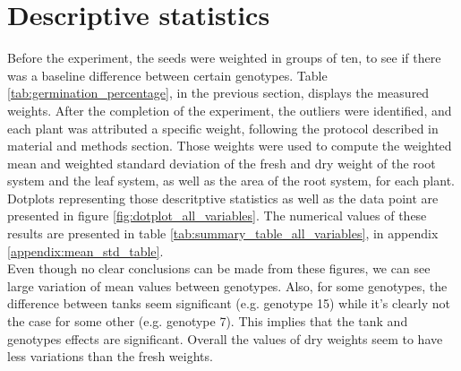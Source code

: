 \section{Descriptive statistics}
Before the experiment, the seeds were weighted in groups of ten, to see if there was a baseline difference between certain genotypes. Table \ref{tab:germination_percentage}, in the previous section, displays the measured weights.
After the completion of the experiment, the outliers were identified, and each plant was attributed a specific weight, following the protocol described in material and methods section. Those weights were used to compute the weighted mean and weighted standard deviation of the fresh and dry weight of the root system and the leaf system, as well as the area of the root system, for each plant. Dotplots representing those descritptive statistics as well as the data point are presented in figure \ref{fig:dotplot_all_variables}. The numerical values of these results are presented in table \ref{tab:summary_table_all_variables}, in appendix \ref{appendix:mean_std_table}.\\

Even though no clear conclusions can be made from these figures, we can see large variation of mean values between genotypes. Also, for some genotypes, the difference between tanks seem significant (e.g. genotype 15) while it's clearly not the case for some other (e.g. genotype 7). This implies that the tank and genotypes effects are significant. Overall the values of dry weights seem to have less variations than the fresh weights.

